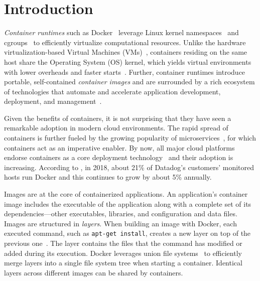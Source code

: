 \section{Introduction}
\label{sec:intro}

%
%
%
%
%
%
%


\emph{Container runtimes} such as Docker~\cite{docker} 
leverage Linux kernel namespaces~\cite{namespaces} and cgroups~\cite{cgroups}
to efficiently virtualize computational resources.
%
Unlike the hardware virtualization-based Virtual Machines
(VMs)~\cite{adams2006comparison}, containers residing on the same host share
the Operating System (OS) kernel, which yields virtual environments with
lower overheads and faster starts~\cite{7819678}.
%
Further, container runtimes introduce portable, self-contained \emph{container
images} and are surrounded by a rich ecosystem of technologies that automate
and accelerate application development, deployment, and
management~\cite{cncfprojects}.

Given the benefits of containers, it is not surprising that they have seen a
remarkable adoption in modern cloud environments.
%
The rapid spread of containers is further fueled by the growing popularity of
microservices~\cite{wolff2016microservices},
for which containers act as an imperative enabler.
%
By now, all major cloud platforms endorse containers as a core deployment
technology~\cite{googlecengine,azurec,ibmkube,awscont} and their adoption
is increasing.
%
According to \cite{20percentdocker}, in 2018, about 21\% of Datadog's customers' monitored hosts run Docker and this continues to grow by about 5\% annually.


Images are at the core of containerized applications.
%
An application's container image includes the executable of the application
along with a complete set of its dependencies---other executables, libraries, and
configuration and data files.
%
Images are structured in \emph{layers}. When building an image with Docker, each
executed command, such as \texttt{apt-get install}, creates a new layer on
top of the previous one~\cite{dockerfile}.
%
The layer contains the files that the command has modified or added during its
execution.
%
%
Docker leverages union file systems~\cite{docker-driver-eval} to
efficiently merge layers into a single file system tree when starting a container.
%
Identical layers across different images can be shared by containers.

